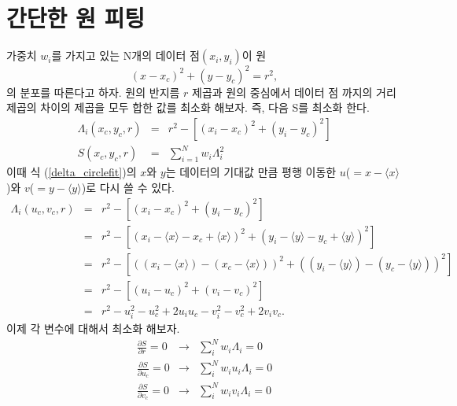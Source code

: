 \documentclass[chapter,a4paper,10pt]{oblivoir}
\begin{document}
\section{간단한 원 피팅}
가중치 $w_i$를 가지고 있는 N개의 데이터 점$(x_i, y_i)$이 원
\begin{equation}
(x-x_c)^2 + (y-y_c)^2 = r^2,
\end{equation}
의 분포를 따른다고 하자.
원의 반지름 $r$ 제곱과 원의 중심에서 데이터 점 까지의 거리 제곱의 차이의
제곱을 모두 합한 값를 최소화 해보자. 즉, 다음 S를 최소화 한다.
\begin{eqnarray}
\Lambda_i(x_c,y_c,r) &=& r^2 - \left[(x_i-x_c)^2 + (y_i-y_c)^2\right] \label{delta_circlefit} \\
S(x_c,y_c,r) &=& \sum_{i=1}^Nw_i \Lambda_i^2
\end{eqnarray}
이때 식 (\ref{delta_circlefit})의 $x$와 $y$는 데이터의 기대값 만큼 평행 이동한
$u$($=x-\langle x \rangle$)와 $v$($=y-\langle y \rangle$)로 다시 쓸 수 있다.
\begin{eqnarray}
\Lambda_i(u_c,v_c,r)
&=& r^2 - \left[(x_i-x_c)^2 + (y_i-y_c)^2\right] \\
&=& r^2 - \left[ (x_i - \langle x \rangle - x_c + \langle x \rangle)^2
 +(y_i - \langle y \rangle - y_c + \langle y \rangle)^2\right] \nonumber\\
&=& r^2 - \left[ ((x_i - \langle x \rangle) - (x_c - \langle x \rangle))^2
 +((y_i - \langle y \rangle) - (y_c - \langle y \rangle))^2\right] \nonumber\\
&=& r^2 - \left[ (u_i - u_c)^2 +(v_i - v_c)^2\right] \\
&=& r^2 - u_i^2 - u_c^2 + 2u_iu_c - v_i^2 - v_c^2 + 2v_iv_c.\nonumber
\end{eqnarray}
이제 각 변수에 대해서 최소화 해보자.
\begin{eqnarray}
\frac{\partial S}{\partial r} = 0 &\longrightarrow&
\sum_i^Nw_i\Lambda_i = 0 \label{partial_lambda_r}\\
\frac{\partial S}{\partial u_c} = 0 &\longrightarrow& \sum_i^Nw_iu_i\Lambda_i = 0 \label{partial_lambda_u}\\
\frac{\partial S}{\partial v_c} = 0 &\longrightarrow& \sum_i^Nw_iv_i\Lambda_i = 0 \label{partial_lambda_v}
\end{eqnarray}
\end{document}
